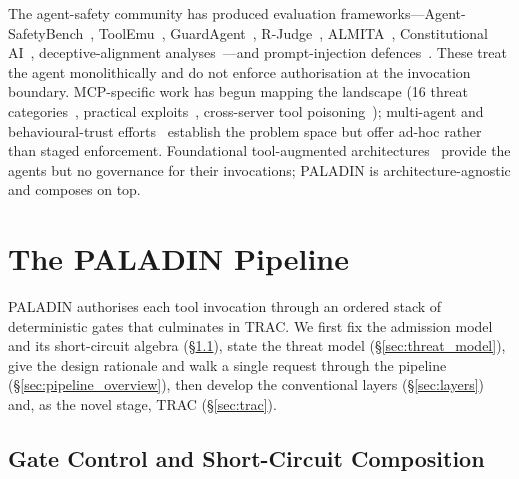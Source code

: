\documentclass[sigconf,review,anonymous]{acmart}
\begin{document}
The agent-safety community has produced evaluation frameworks---Agent-SafetyBench~\cite{zhang2024agentsafetybench}, ToolEmu~\cite{ruan2024toolemu}, GuardAgent~\cite{xiang2024guardagent}, R-Judge~\cite{yuan2024rjudge}, ALMITA~\cite{arcadinho2024almita}, Constitutional AI~\cite{bai2022constitutional}, deceptive-alignment analyses~\cite{hubinger2024sleeper}---and prompt-injection defences~\cite{liu2024formalizing,zhan2024injecagent,debenedetti2024agentdojo,kim2025promptflow,inan2023llamaguard}. These treat the agent monolithically and do not enforce authorisation at the invocation boundary. MCP-specific work has begun mapping the landscape (16 threat categories~\cite{gupta2025security}, practical exploits~\cite{jamshidi2025securing}, cross-server tool poisoning~\cite{invariantlabs2025toolpoisoning}); multi-agent and behavioural-trust efforts~\cite{patil2026sentinelagent,schroederdewitt2025open,xu2025master,wu2023autogen,rao1995bdi,csa2025fortifying,cisco2025redefining} establish the problem space but offer ad-hoc rather than staged enforcement. Foundational tool-augmented architectures~\cite{schick2023toolformer,yao2023react,wang2023voyager,wang2024survey,xi2025rise} provide the agents but no governance for their invocations; PALADIN is architecture-agnostic and composes on top.

\section{The PALADIN Pipeline}
\label{sec:architecture}
\label{sec:framework}


PALADIN authorises each tool invocation through an ordered stack of deterministic gates that culminates in TRAC. We first fix the admission model and its short-circuit algebra (\S\ref{sec:state_model}), state the threat model (\S\ref{sec:threat_model}), give the design rationale and walk a single request through the pipeline (\S\ref{sec:pipeline_overview}), then develop the conventional layers (\S\ref{sec:layers}) and, as the novel stage, TRAC (\S\ref{sec:trac}).

\subsection{Gate Control and Short-Circuit Composition}
\label{sec:state_model}
\label{sec:request_model}
\label{sec:composition}
\label{sec:composition_properties}
\end{document}
